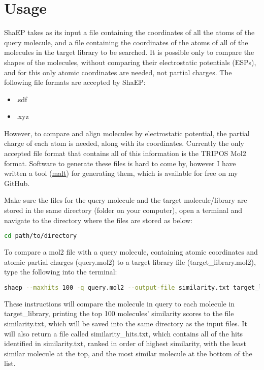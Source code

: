 \documentclass[11pt]{article} %
\begin{document}
\section{Usage}
ShaEP takes as its input a file containing the coordinates of all the atoms of the query molecule, and a file containing the coordinates of the atoms of all of the molecules in the target library to be searched. It is possible only to compare the shapes of the molecules, without comparing their electrostatic potentials (ESPs), and for this only atomic coordinates are needed, not partial charges. The following file formats are accepted by ShaEP:

\begin{itemize}
\item .sdf
\item .xyz
\end{itemize}

However, to compare and align molecules by electrostatic potential, the partial charge of each atom is needed, along with its coordinates. Currently the only accepted file format that contains all of this information is the TRIPOS Mol2 format. Software to generate these files is hard to come by, however I have written a tool (\href{https://github.com/matthewtoholland/malt}{malt}) for generating them, which is available for free on my GitHub.

Make sure the files for the query molecule and the target molecule/library are stored in the same directory (folder on your computer), open a terminal and navigate to the directory where the files are stored as below:
\begin{lstlisting}[language=bash]
cd path/to/directory
\end{lstlisting}

To compare a mol2 file with a query molecule, containing atomic coordinates and atomic partial charges (query.mol2) to a target library file (target\_library.mol2), type the following into the terminal:

\begin{lstlisting}[language=bash]
shaep --maxhits 100 -q query.mol2 --output-file similarity.txt target_library.mol2
\end{lstlisting}

These instructions will compare the molecule in query to each molecule in target\_library, printing the top 100 molecules' similarity scores to the file similarity.txt, which will be saved into the same directory as the input files. It will also return a file called similarity\_hits.txt, which contains all of the hits identified in similarity.txt, ranked in order of highest similarity, with the least similar molecule at the top, and the most similar molecule at the bottom of the list.
\end{document}

